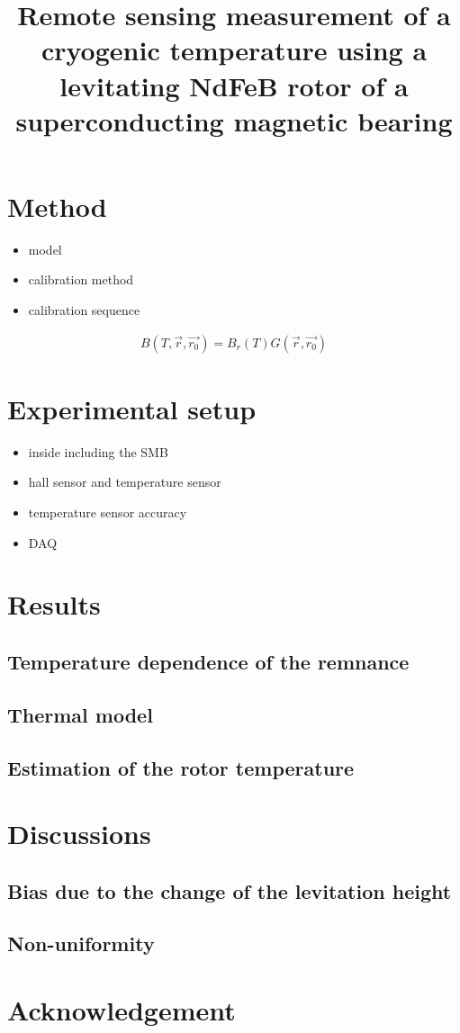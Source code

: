 \documentclass[12pt]{amsart}
\title{Remote sensing measurement of a cryogenic temperature using a levitating NdFeB rotor of a superconducting magnetic bearing}
\author{}
\date{} %
\begin{document}
\maketitle
\tableofcontents



\section{Method}

\begin{itemize}
\item model
\item calibration method
\item calibration sequence
\end{itemize}


\begin{eqnarray}
	B(T,\vec{r},\vec{r_0}) = B_r(T) G(\vec{r},\vec{r_0})
\end{eqnarray}

\section{Experimental setup}
\begin{itemize}
\item inside including the SMB
\item hall sensor and temperature sensor
\item temperature sensor accuracy
\item DAQ
\end{itemize}

\section{Results}
\subsection{Temperature dependence of the remnance}

\subsection{Thermal model}

\subsection{Estimation of the rotor temperature}

\section{Discussions}
\subsection{Bias due to the change of the levitation height}

\subsection{Non-uniformity}

\section*{Acknowledgement}
\end{document}
